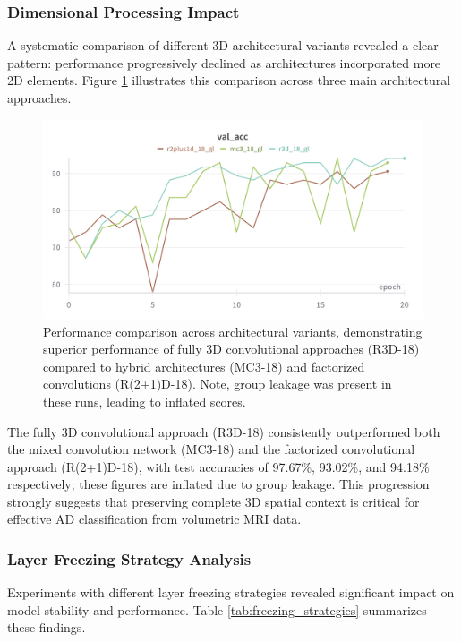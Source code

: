 \documentclass[11pt, a4paper]{article}
\begin{document}
\subsubsection{Dimensional Processing Impact}

A systematic comparison of different 3D architectural variants revealed a clear pattern: performance progressively declined as architectures incorporated more 2D elements. Figure \ref{fig:architecture_comparison_gl} illustrates this comparison across three main architectural approaches.

\begin{figure}[htbp]
  \centering
  \includegraphics[width=\textwidth]{figures/archs_acc_gl.png}
  \caption{Performance comparison across architectural variants, demonstrating superior performance of fully 3D convolutional approaches (R3D-18) compared to hybrid architectures (MC3-18) and factorized convolutions (R(2+1)D-18). Note, group leakage was present in these runs, leading to inflated scores.}
  \label{fig:architecture_comparison_gl}
\end{figure}

The fully 3D convolutional approach (R3D-18) consistently outperformed both the mixed convolution network (MC3-18) and the factorized convolutional approach (R(2+1)D-18), with test accuracies of 97.67\%, 93.02\%, and 94.18\% respectively; these figures are inflated due to group leakage. This progression strongly suggests that preserving complete 3D spatial context is critical for effective AD classification from volumetric MRI data.

\subsubsection{Layer Freezing Strategy Analysis}

Experiments with different layer freezing strategies revealed significant impact on model stability and performance. Table \ref{tab:freezing_strategies} summarizes these findings.
\end{document}
